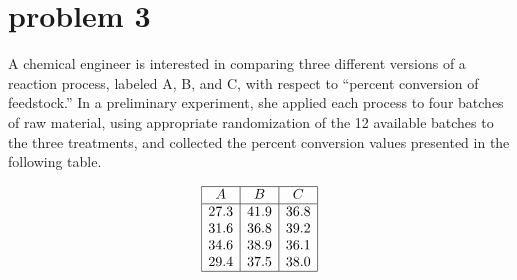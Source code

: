 \documentclass{article}
\begin{document}
\section{problem 3}

A chemical engineer is interested in comparing three different versions of a reaction process, labeled
A, B, and C, with respect to “percent conversion of feedstock.” In a preliminary experiment, she
applied each process to four batches of raw material, using appropriate randomization of the 12
available batches to the three treatments, and collected the percent conversion values presented in
the following table.

$$
	\begin{array}{|c|c|c|}
		\hline
		A    & B    & C    \\
		\hline
		27.3 & 41.9 & 36.8 \\
		31.6 & 36.8 & 39.2 \\
		34.6 & 38.9 & 36.1 \\
		29.4 & 37.5 & 38.0 \\
		\hline
	\end{array}
$$
\end{document}
